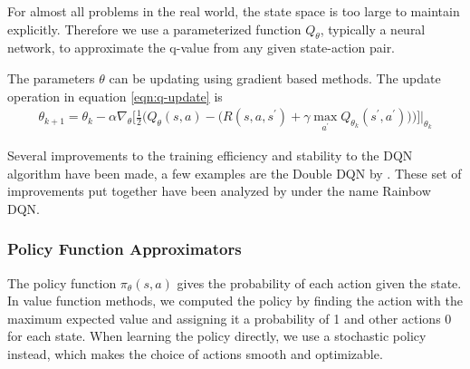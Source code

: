 For almost all problems in the real world, the state space is too large to maintain explicitly. Therefore we use a parameterized function $Q_{\theta}$, typically a neural network, to approximate the q-value from any given state-action pair.

The parameters $\theta$ can be updating using gradient based methods. The update operation in equation \ref{eqn:q-update} is 
\begin{equation}
    \label{eqn:q-update}
    \begin{split}
        \theta_{k+1} = \theta_k - \alpha \nabla_\theta \Bigg[\frac{1}{2} \bigg(Q_\theta(s, a) - \Big(R(s, a, s^\prime) + \gamma \max_{a^\prime} Q_{\theta_k}(s^\prime, a^\prime)  \Big) \bigg) \Bigg] \Bigg\vert_{\theta_k}
    \end{split}
\end{equation}

Several improvements to the training efficiency and stability to the DQN algorithm have been made, a few examples are the Double DQN by \cite{double-dqn}. These set of improvements put together have been analyzed by \cite{rainbow-dqn} under the name Rainbow DQN.

\subsubsection{Policy Function Approximators}

The policy function $\pi_\theta(s, a)$ gives the probability of each action given the state. In value function methods, we computed the policy by finding the action with the maximum expected value and assigning it a probability of 1 and other actions 0 for each state. When learning the policy directly, we use a stochastic policy instead, which makes the choice of actions smooth and optimizable.

